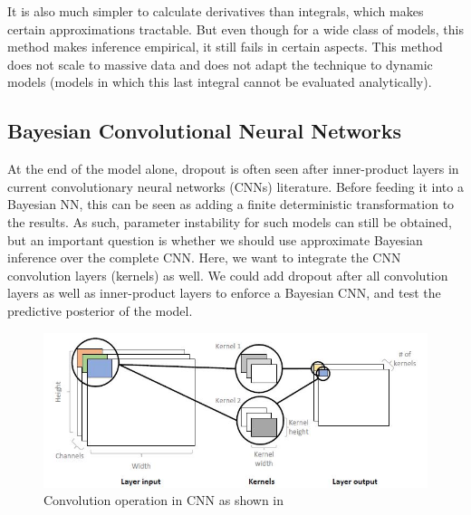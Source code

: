\documentclass[journal]{IEEEtran}
\begin{document}
It is also much simpler to calculate
derivatives than integrals, which makes certain approximations tractable.
But even though for a wide class of models, this
method makes inference empirical, it still fails in certain aspects.
This method does not scale to massive data and does not adapt the technique
to dynamic models (models in which this last integral cannot be evaluated analytically)\cite{posch2019variational}. 

\subsection{Bayesian Convolutional Neural Networks}

At the end of the model alone, dropout is often
seen after inner-product layers in current convolutionary neural networks (CNNs) literature.
Before feeding it into a Bayesian NN, this can be seen as adding a finite deterministic transformation to the results. As such, parameter
instability for such models can still be obtained, but an important question is whether we should use approximate Bayesian inference over the complete CNN. \cite{kendall2019geometry}
Here, we want to integrate the
CNN convolution layers (kernels) as well.
We could add dropout after all convolution layers as well as inner-product layers to
enforce a Bayesian CNN, and test the predictive posterior of the model.

\begin{figure}
  \centering
  \includegraphics{figures/cnn.JPG}
  \caption{Convolution operation in CNN as shown in \cite{gal2016uncertainty}}
\end{figure}
\end{document}
